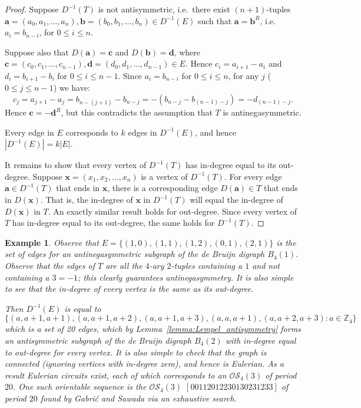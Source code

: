 \documentclass[a4paper,11pt]{article}
\newtheorem{example}[lemma]{Example}
\begin{document}
\begin{proof}
Suppose $D^{-1}(T)$ is not antisymmetric, i.e.\ there exist $(n+1)$-tuples
$\mathbf{a}=(a_0,a_1,\ldots,a_{n}),\mathbf{b}=(b_0,b_1,\ldots,b_{n})\in D^{-1}(E)$ such that
$\mathbf{a}=\mathbf{b}^R$, i.e.\ $a_i=b_{n-i}$, for $0\leq i\leq n$.

Suppose also that $D(\mathbf{a})=\mathbf{c}$ and $D(\mathbf{b})=\mathbf{d}$, where
$\mathbf{c}=(c_0,c_1,\ldots,c_{n-1}),\mathbf{d}=(d_0,d_1,\ldots,d_{n-1})\in E$. Hence
$c_i=a_{i+1}-a_i$ and $d_i=b_{i+1}-b_i$ for $0\leq i\leq n-1$.  Since $a_i=b_{n-i}$ for $0\leq
i\leq n$, for any $j$ ($0\leq j\leq n-1$) we have:
\[ c_j = a_{j+1}-a_j = b_{n-(j+1)}-b_{n-j} = -(b_{n-j}-b_{(n-1)-j})= -d_{(n-1)-j}. \]
Hence $\mathbf{c}=-\mathbf{d}^R$, but this contradicts the assumption that $T$ is
antinegasymmetric.

Every edge in $E$ corresponds to $k$ edges in $D^{-1}(E)$, and hence $|D^{-1}(E)|=k|E|$.

It remains to show that every vertex of $D^{-1}(T)$ has in-degree equal to its out-degree.
Suppose $\mathbf{x}=(x_1,x_2,\ldots,x_{n})$ is a vertex of $D^{-1}(T)$.  For every edge
$\mathbf{a}\in D^{-1}(T)$ that ends in $\mathbf{x}$, there is a corresponding edge
$D(\mathbf{a})\in T$ that ends in $D(\mathbf{x})$.  That is, the in-degree of $\mathbf{x}$ in
$D^{-1}(T)$ will equal the in-degree of $D(\mathbf{x})$ in $T$.  An exactly similar result
holds for out-degree.  Since every vertex of $T$ has in-degree equal to its out-degree, the
same holds for $D^{-1}(T)$.
\end{proof}

\begin{example}
Observe that $E=\{(1,0),(1,1),(1,2),(0,1),(2,1)\}$ is the set of edges for an antinegasymmetric
subgraph of the de Bruijn digraph $B_{4}(1)$. Observe that the edges of $T$ are all the $4$-ary
$2$-tuples containing a $1$ and not containing a $3=-1$; this clearly guarantees antinegasymmetry.
It is also simple to see that the in-degree of every vertex is the same as its out-degree.

Then $D^{-1}(E)$ is equal to
\[ \{(a,a+1,a+1),(a,a+1,a+2),(a,a+1,a+3),(a,a,a+1),(a,a+2,a+3):a\in\mathbb{Z}_4\} \]
which is a set of 20 edges, which by Lemma~\ref{lemma:Lempel_antisymmetry} forms an antisymmetric
subgraph of the de Bruijn digraph $B_{4}(2)$ with in-degree equal to out-degree for every vertex.
It is also simple to check that the graph is connected (ignoring vertices with in-degree zero),
and
hence is Eulerian. As a result Eulerian circuits exist, each of which corresponds to an
$\mathcal{OS}_4(3)$ of period $20$. One such orientable sequence is the $\mathcal{OS}_4(3)$
$[00112012230130231233]$ of period $20$ found by Gabri\'{c} and Sawada \cite{Gabric25} via an
exhaustive search.
\end{example}
\end{document}
